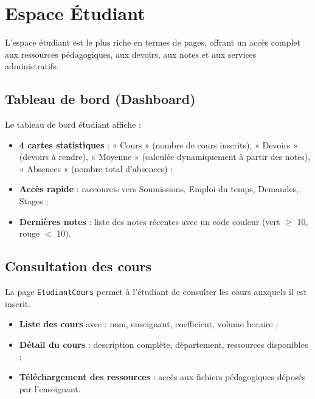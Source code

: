\section{Espace Étudiant}

L'espace étudiant est le plus riche en termes de pages, offrant un accès complet aux ressources pédagogiques, aux devoirs, aux notes et aux services administratifs.

\subsection{Tableau de bord (Dashboard)}

Le tableau de bord étudiant affiche :
\begin{itemize}[noitemsep]
    \item \textbf{4 cartes statistiques} : « Cours » (nombre de cours inscrits), « Devoirs » (devoirs à rendre), « Moyenne » (calculée dynamiquement à partir des notes), « Absences » (nombre total d'absences) ;
    \item \textbf{Accès rapide} : raccourcis vers Soumissions, Emploi du temps, Demandes, Stages ;
    \item \textbf{Dernières notes} : liste des notes récentes avec un code couleur (vert $\geq$ 10, rouge $<$ 10).
\end{itemize}


\subsection{Consultation des cours}

La page \texttt{EtudiantCours} permet à l'étudiant de consulter les cours auxquels il est inscrit.

\begin{itemize}[noitemsep]
    \item \textbf{Liste des cours} avec : nom, enseignant, coefficient, volume horaire ;
    \item \textbf{Détail du cours} : description complète, département, ressources disponibles ;
    \item \textbf{Téléchargement des ressources} : accès aux fichiers pédagogiques déposés par l'enseignant.
\end{itemize}

